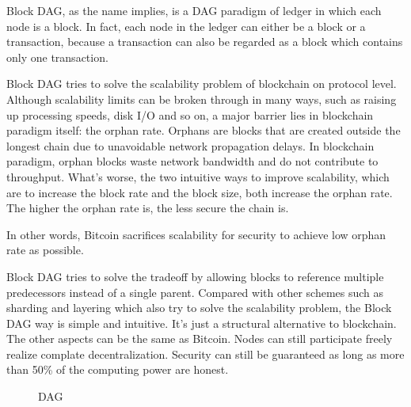 \documentclass[a4paper,11pt]{article}
\begin{document}
Block DAG, as the name implies, is a DAG paradigm of ledger in which each node
is a block. In fact, each node in the ledger can either be a block or a
transaction, because a transaction can also be regarded as a block which
contains only one transaction.

Block DAG tries to solve the scalability problem of blockchain on protocol
level. Although scalability limits can be broken through in many ways, such as
raising up processing speeds, disk I/O and so on, a major barrier lies in
blockchain paradigm itself: the orphan rate. Orphans are blocks that are created
outside the longest chain due to unavoidable network propagation delays. In
blockchain paradigm, orphan blocks waste network bandwidth and do not contribute
to throughput. What's worse, the two intuitive ways to improve scalability, which
are to increase the block rate and the block size, both increase the orphan
rate. The higher the orphan rate is, the less secure the chain
is\cite{Yonatan-high-rate-bitcoin}\cite{bitcoin-backbone}\cite{https://eprint.iacr.org/2016/454.pdf}.

In other words, Bitcoin sacrifices scalability for security to achieve low
orphan rate as possible.

Block DAG tries to solve the tradeoff by allowing blocks to reference multiple
predecessors instead of a single parent. Compared with other schemes such as
sharding and layering which also try to solve the scalability problem, the Block
DAG way is simple and intuitive. It's just a structural alternative to
blockchain. The other aspects can be the same as Bitcoin. Nodes can still
participate freely realize complate decentralization.  Security can still be
guaranteed as long as more than 50\% of the computing power are honest.

\begin{figure}[hbt]
	\centerline{%
	}
\caption{DAG}
\end{figure}
\end{document}
